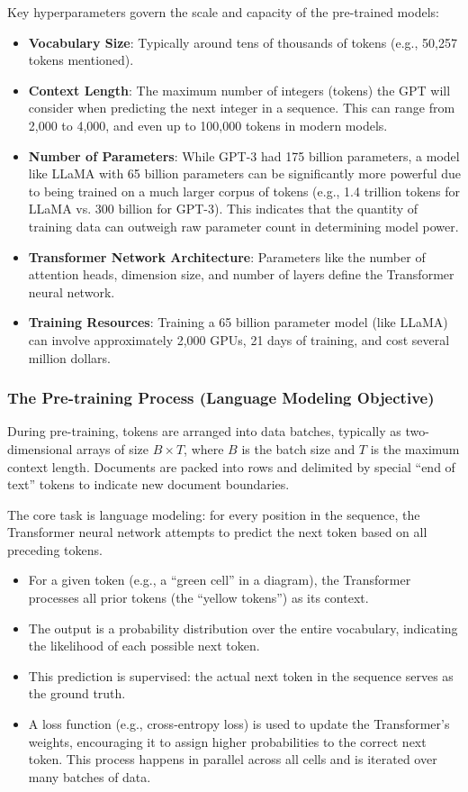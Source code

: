 Key hyperparameters govern the scale and capacity of the pre-trained models:
\begin{itemize}
    \item \textbf{Vocabulary Size}: Typically around tens of thousands of tokens (e.g., 50,257 tokens mentioned).
    \item \textbf{Context Length}: The maximum number of integers (tokens) the GPT will consider when predicting the next integer in a sequence. This can range from 2,000 to 4,000, and even up to 100,000 tokens in modern models.
    \item \textbf{Number of Parameters}: While GPT-3 had 175 billion parameters, a model like LLaMA with 65 billion parameters can be significantly more powerful due to being trained on a much larger corpus of tokens (e.g., 1.4 trillion tokens for LLaMA vs. 300 billion for GPT-3). This indicates that the quantity of training data can outweigh raw parameter count in determining model power.
    \item \textbf{Transformer Network Architecture}: Parameters like the number of attention heads, dimension size, and number of layers define the Transformer neural network.
    \item \textbf{Training Resources}: Training a 65 billion parameter model (like LLaMA) can involve approximately 2,000 GPUs, 21 days of training, and cost several million dollars.
\end{itemize}

\subsubsection{The Pre-training Process (Language Modeling Objective)}

During pre-training, tokens are arranged into data batches, typically as two-dimensional arrays of size $B \times T$, where $B$ is the batch size and $T$ is the maximum context length. Documents are packed into rows and delimited by special ``end of text'' tokens to indicate new document boundaries.

The core task is language modeling: for every position in the sequence, the Transformer neural network attempts to predict the next token based on all preceding tokens.
\begin{itemize}
    \item For a given token (e.g., a ``green cell'' in a diagram), the Transformer processes all prior tokens (the ``yellow tokens'') as its context.
    \item The output is a probability distribution over the entire vocabulary, indicating the likelihood of each possible next token.
    \item This prediction is supervised: the actual next token in the sequence serves as the ground truth.
    \item A loss function (e.g., cross-entropy loss) is used to update the Transformer's weights, encouraging it to assign higher probabilities to the correct next token. This process happens in parallel across all cells and is iterated over many batches of data.
\end{itemize}

